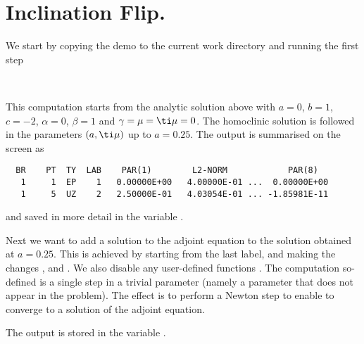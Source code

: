 \documentclass[12pt]{report}
\begin{document}
\section{Inclination Flip.}
We start by copying the demo to the current work directory 
and running the first step
\begin{center}
\\
\end{center}
This computation starts from the analytic solution above with 
$a=0$, $b=1$, $c=-2$, $\alpha=0$, $\beta=1$ and 
$\gamma = \mu=\ti \mu =0$. The homoclinic solution is followed in the
parameters $(a,\ti \mu)$  up to $a=0.25$. 
The output is summarised on the screen as
\begin{verbatim}
  BR    PT  TY  LAB    PAR(1)        L2-NORM            PAR(8)     
   1     1  EP    1   0.00000E+00   4.00000E-01 ...  0.00000E+00
   1     5  UZ    2   2.50000E-01   4.03054E-01 ... -1.85981E-11
\end{verbatim}
and saved in more detail in the \python variable .

Next we want to add a solution to the adjoint equation to the
solution obtained at $a=0.25$. This is
achieved by starting from the last label, and making the changes
,  and . We also disable any
user-defined functions . The computation so-defined 
is a single step in a trivial parameter  (namely a parameter
that does not appear in the problem). The effect is to perform a Newton
step to enable \AUTO to converge to a solution of the adjoint equation.
\begin{center}
\end{center} 
The output is stored in the \python variable .
\end{document}
